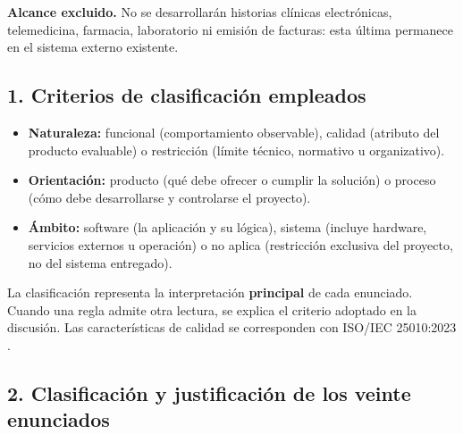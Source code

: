 \documentclass[12pt,a4paper]{article}
\begin{document}
\textbf{Alcance excluido.} No se desarrollarán historias clínicas electrónicas, telemedicina, farmacia, laboratorio ni emisión de facturas: esta última permanece en el sistema externo existente.

\subsection*{1. Criterios de clasificación empleados}

\begin{itemize}[leftmargin=*]
    \item \textbf{Naturaleza:} funcional (comportamiento observable), calidad (atributo del producto evaluable) o restricción (límite técnico, normativo u organizativo).
    \item \textbf{Orientación:} producto (qué debe ofrecer o cumplir la solución) o proceso (cómo debe desarrollarse y controlarse el proyecto).
    \item \textbf{Ámbito:} software (la aplicación y su lógica), sistema (incluye hardware, servicios externos u operación) o no aplica (restricción exclusiva del proyecto, no del sistema entregado).
\end{itemize}

La clasificación representa la interpretación \textbf{principal} de cada enunciado. Cuando una regla admite otra lectura, se explica el criterio adoptado en la discusión. Las características de calidad se corresponden con ISO/IEC 25010:2023 \cite{iso25010}.


\subsection*{2. Clasificación y justificación de los veinte enunciados}

\small
\renewcommand{\arraystretch}{1.17}
\end{document}
